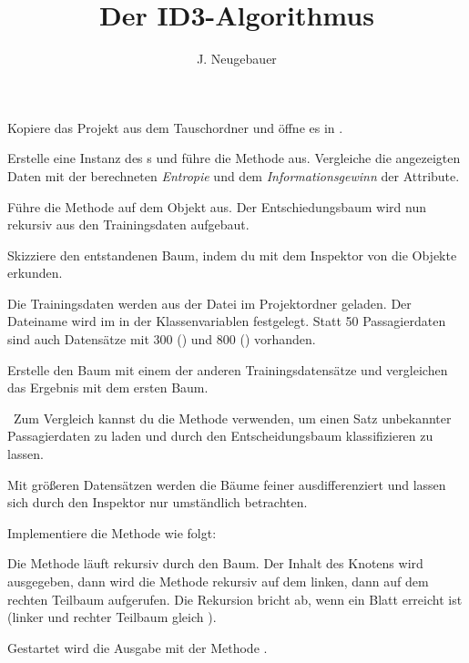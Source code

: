 \documentclass[10pt, a4paper]{scrartcl}
\author{J. Neugebauer}
\title{Der ID3-Algorithmus}
\date{\Heute}
\begin{document}
\ReiheTitel

Kopiere das Projekt  aus dem Tauschordner
und öffne es in .

\begin{aufgabe}
	Erstelle eine Instanz des s und führe die Methode 
	 aus. Vergleiche die angezeigten Daten mit
	der berechneten \emph{Entropie} und dem \emph{Informationsgewinn} der Attribute.
\end{aufgabe}

\begin{aufgabe}
	Führe die Methode  auf dem Objekt aus. Der
	Entschiedungsbaum wird nun rekursiv aus den Trainingsdaten aufgebaut.
	
	Skizziere den entstandenen Baum, indem du mit dem Inspektor von 
	 die Objekte erkunden.
	
	\begin{rahmen}
		\vspace*{4cm}
	\end{rahmen}
	\medskip
\end{aufgabe}

\begin{aufgabe}
	Die Trainingsdaten werden aus der Datei  im
	Projektordner geladen. Der Dateiname wird im  in der Klassenvariablen
	 festgelegt. Statt 50 Passagierdaten sind auch Datensätze mit
	300 () und 800 ()
	vorhanden.
	
	Erstelle den Baum mit einem der anderen Trainingsdatensätze und vergleichen
	das Ergebnis mit dem ersten Baum.
	
	\symInfo\ Zum Vergleich kannst du die Methode  verwenden, um einen Satz
	unbekannter Passagierdaten zu laden und durch den Entscheidungsbaum klassifizieren zu lassen.
\end{aufgabe}

\begin{aufgabe}
	Mit größeren Datensätzen werden die Bäume feiner ausdifferenziert und lassen sich durch
	den Inspektor nur umständlich betrachten.
	
	Implementiere die Methode  wie folgt:
	
	Die Methode läuft rekursiv durch den Baum. Der Inhalt des Knotens wird ausgegeben, dann wird die Methode
	rekursiv auf dem linken, dann auf dem rechten Teilbaum aufgerufen. Die Rekursion bricht ab, wenn ein Blatt
	erreicht ist (linker und rechter Teilbaum gleich ).
	
	Gestartet wird die Ausgabe mit der Methode .
\end{aufgabe}
\end{document}

